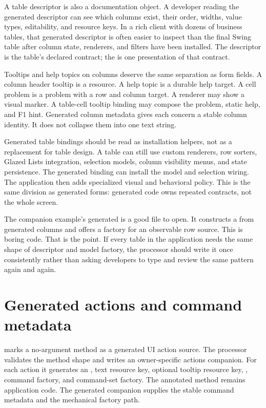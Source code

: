 A table descriptor is also a documentation object. A developer reading the
generated descriptor can see which columns exist, their order, widths, value
types, editability, and resource keys. In a rich client with dozens of
business tables, that generated descriptor is often easier to inspect than the
final Swing table after column state, renderers, and filters have been
installed. The descriptor is the table's declared contract; the 
is one presentation of that contract.

Tooltips and help topics on columns deserve the same separation as form fields.
A column header tooltip is a resource. A help topic is a durable help target.
A cell problem is a problem with a row and column target. A renderer may show
a visual marker. A table-cell tooltip binding may compose the problem, static
help, and F1 hint. Generated column metadata gives each concern a stable
column identity. It does not collapse them into one text string.

Generated table bindings should be read as installation helpers, not as a
replacement for table design. A table can still use custom renderers, row
sorters, Glazed Lists integration, selection models, column visibility menus,
and state persistence. The generated binding can install the model and
selection wiring. The application then adds specialized visual and behavioral
policy. This is the same division as generated forms: generated code owns
repeated contracts, not the whole screen.

The companion example's generated  is a good
file to open. It constructs a  from generated columns and
offers a  factory for an observable row source. This is boring
code. That is the point. If every table in the application needs the same
shape of descriptor and model factory, the processor should write it once
consistently rather than asking developers to type and review the same pattern
again and again.

\section{Generated actions and command metadata}

 marks a no-argument  method as a generated UI action
source. The processor validates the method shape and writes an owner-specific
actions companion. For each action it generates an , text
resource key, optional tooltip resource key, , command
factory, and command-set factory. The annotated method remains application
code. The generated companion supplies the stable command metadata and the
mechanical factory path.

